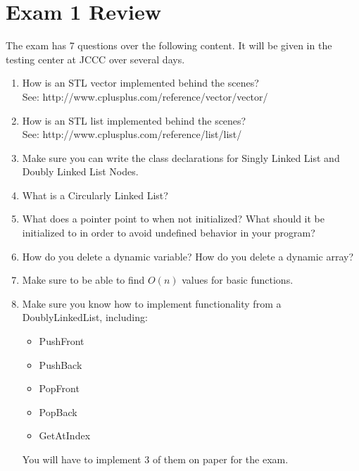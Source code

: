 \documentclass[a4paper,12pt]{book}
\title{}
\author{Rachel Morris}
\date{\today}
\newcounter{question}
\begin{document}
    \chapter*{Exam 1 Review}
    
    The exam has 7 questions over the following content. It will be given
    in the testing center at JCCC over several days.

    \begin{enumerate}
        \item How is an STL vector implemented behind the scenes? \\
            See: http://www.cplusplus.com/reference/vector/vector/

        \item How is an STL list implemented behind the scenes? \\
            See: http://www.cplusplus.com/reference/list/list/
        
        \item Make sure you can write the class declarations
            for Singly Linked List and Doubly Linked List Nodes.
            
        \item What is a Circularly Linked List?
        
        \item What does a pointer point to when not initialized? What should
            it be initialized to in order to avoid undefined behavior in
            your program?
            
        \item How do you delete a dynamic variable? How do you delete a dynamic array?
        
        \item Make sure to be able to find $O(n)$ values for basic functions.
        
        \item Make sure you know how to implement functionality from a DoublyLinkedList, including:
            
            \begin{itemize}
                \item   PushFront
                \item   PushBack
                \item   PopFront
                \item   PopBack
                \item   GetAtIndex
            \end{itemize}
            
            You will have to implement 3 of them on paper for the exam.
                   
    \end{enumerate}
\end{document}
